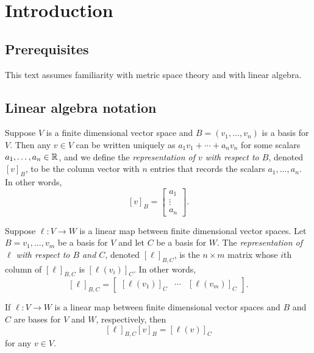 \chapter{Introduction}

\section{Prerequisites}

This text assumes familiarity with metric space theory and with linear algebra. 

\section{Linear algebra notation}

\begin{definition}
	Suppose $V$ is a finite dimensional vector space and $B = ( v_1, \dotsc, v_n )$ is a basis for $V$. Then any $v \in V$ can be written uniquely as $a_1v_1 + \dotsb + a_n v_n$ for some scalars $a_1, \dotsc, a_n \in \mathbb{R}$, and we define the \emph{representation of $v$ with respect to $B$}, denoted $[v]_B$, to be the column vector with $n$ entries that records the scalars $a_1, \dotsc, a_n$. In other words,
\[ [v]_B = \begin{bmatrix} a_1 \\ \vdots \\ a_n \end{bmatrix}. \]
\end{definition}

\begin{definition}
Suppose $\ell : V \to W$ is a linear map between finite dimensional vector spaces. Let $B = v_1, \dotsc, v_m$ be a basis for $V$ and let $C$ be a basis for $W$. The \emph{representation of $\ell$ with respect to $B$ and $C$}, denoted $[\ell]_{B,C}$, is the $n \times m$ matrix whose $i$th column of $[\ell]_{B,C}$ is $[\ell(v_i)]_C$. In other words,
\[ [\ell]_{B,C} = \begin{bmatrix} [\ell(v_1)]_C & \dotsb & [\ell(v_m)]_C \end{bmatrix}. \]
\end{definition}

\begin{lemma}
	If $\ell : V \to W$ is a linear map between finite dimensional vector spaces and $B$ and $C$ are bases for $V$ and $W$, respectively, then \[ [\ell]_{B,C}[v]_B = [\ell(v)]_C \]
	for any $v  \in V$. 
\end{lemma}

